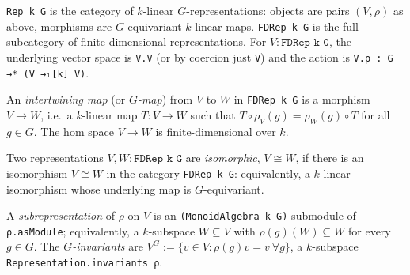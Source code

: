 \begin{definition}
  \label{def:rep-categories}
  \mathlibok
  \texttt{Rep k G} is the category of $k$-linear $G$-representations:
  objects are pairs $(V, \rho)$ as above, morphisms are $G$-equivariant
  $k$-linear maps. \texttt{FDRep k G} is the full subcategory of finite-dimensional
  representations. For $V : \texttt{FDRep k G}$, the underlying vector space is
  \texttt{V.V} (or by coercion just \texttt{V}) and the action is
  \texttt{V.ρ : G →* (V →ₗ[k] V)}.
\end{definition}

\begin{definition}[Intertwining map = morphism in \texttt{FDRep k G}]
  \label{def:intertwiner}
  \mathlibok
  An \emph{intertwining map} (or \emph{$G$-map}) from $V$ to $W$ in
  \texttt{FDRep k G} is a morphism $V \longrightarrow W$, i.e.\ a $k$-linear
  map $T : V \to W$ such that $T \circ \rho_V(g) = \rho_W(g) \circ T$ for all
  $g \in G$. The hom space $V \to W$ is finite-dimensional over $k$.
\end{definition}

\begin{definition}
  \label{def:rep-iso}
  \mathlibok
  Two representations $V, W : \texttt{FDRep k G}$ are \emph{isomorphic},
  $V \cong W$, if there is an isomorphism $V \cong W$ in the category
  \texttt{FDRep k G}: equivalently, a $k$-linear isomorphism whose underlying
  map is $G$-equivariant.
\end{definition}

\begin{definition}
  \label{def:subrep}
  \mathlibok
  A \emph{subrepresentation} of $\rho$ on $V$ is an
  \texttt{(MonoidAlgebra k G)}-submodule of \texttt{ρ.asModule}; equivalently,
  a $k$-subspace $W \subseteq V$ with $\rho(g)(W) \subseteq W$ for every
  $g \in G$. The \emph{$G$-invariants} are
  $V^G := \{v \in V : \rho(g)v = v\ \forall g\}$, a $k$-subspace
  \texttt{Representation.invariants ρ}.
\end{definition}

